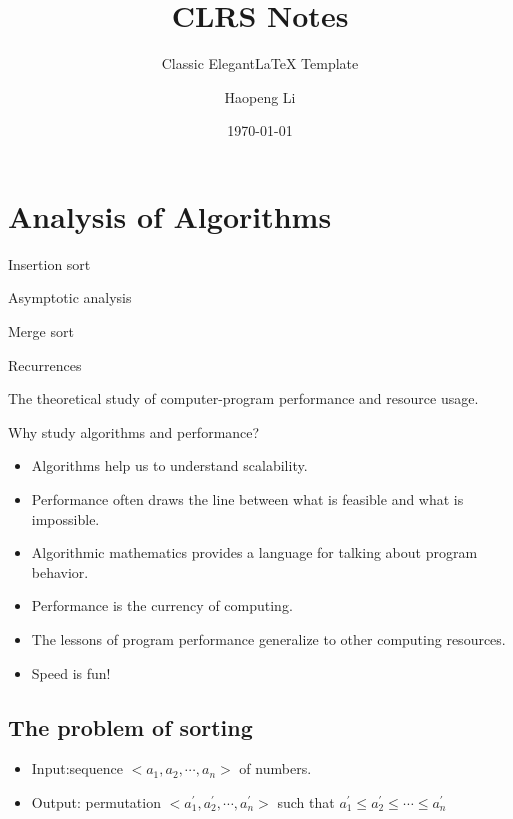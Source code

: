\documentclass[11pt]{elegantbook}
\title{CLRS Notes}
\subtitle{Classic Elegant\LaTeX{} Template}
\author{Haopeng Li}
\institute{Elegant\LaTeX{} Program}
\date{\today}
\begin{document}
\maketitle

\frontmatter
\tableofcontents

\mainmatter

\chapter{Analysis of Algorithms}
\begin{introduction}
  \item Insertion sort
  \item Asymptotic analysis
  \item Merge sort
  \item Recurrences
\end{introduction}
\begin{definition}[Algorithms]
  The theoretical study of computer-program performance and resource usage.
\end{definition}

\begin{note}
  Why study algorithms and performance?
  \begin{itemize}
    \item Algorithms help us to understand scalability.
    \item Performance often draws the line between what is feasible and what is impossible.
    \item Algorithmic mathematics provides a language for talking about program behavior.
    \item Performance is the currency of computing.
    \item The lessons of program performance generalize to other computing resources.
    \item Speed is fun!
  \end{itemize}
\end{note}
\section{The problem of sorting}
\begin{problem}
\begin{itemize}
  \item Input:sequence $<a_{1},a_{2},\cdots,a_{n}>$ of numbers.
  \item Output: permutation $<a_{1}^{\prime},a_2^{\prime},\cdots,a_{n}^{\prime}>$ such that $a_{1}^{\prime} \leq a_{2}^{\prime} \leq \cdots \leq a_{n}^{\prime}$
\end{itemize}
\end{problem}
\end{document}

